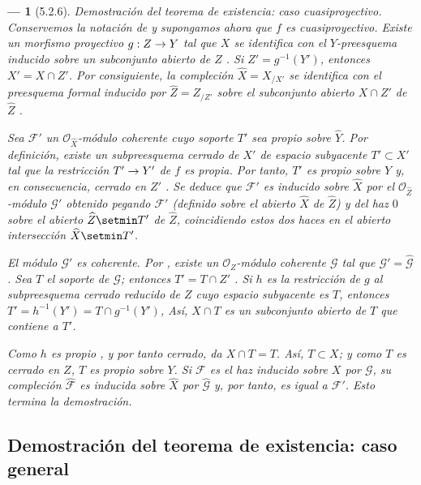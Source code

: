 \documentclass[10pt,oneside,openany]{book}
\theoremstyle{egaenv}\newtheorem*{env}{---}
\theoremstyle{egastatement}
\theoremstyle{egadescription}
\newcommand{\oldpage}[2][]{\marginnote{\normalfont\scriptsize\textbf{#1}\,|\,#2}\ignorespaces}
\renewcommand{\to}{\mathchoice{\longrightarrow}{\rightarrow}{\rightarrow}{\rightarrow}}
\begin{document}
\begin{env}[5.2.6]
\label{III.5.2.6}
\label{III.5.2.6-fr}
\emph{Demostración del teorema de existencia: caso cuasiproyectivo.}
Conservemos la notación de  y supongamos ahora que $f$
es \emph{cuasiproyectivo}. Existe un morfismo proyectivo
$g:Z\to Y$ tal que $X$ se identifica con el $Y$-preesquema
inducido sobre un subconjunto abierto de $Z$ . Si
$Z'=g^{-1}(Y')$, entonces $X'=X\cap Z'$. Por consiguiente, la compleción
$\widehat X=X_{/X'}$ se identifica con el preesquema formal
inducido por $\widehat Z=Z_{/Z'}$ sobre el subconjunto abierto $X\cap Z'$ de
$\widehat Z$ .

Sea $\mathcal F'$ un $\mathcal O_{\widehat X}$-módulo coherente cuyo
soporte $T'$ sea \emph{propio sobre} $\widehat Y$. Por definición, existe
un subpreesquema cerrado de $X'$ de espacio subyacente
$T'\subset X'$ tal que la restricción $T'\to Y'$ de $f$ es
propia. Por tanto, $T'$ es propio \emph{sobre} $Y$ y, en consecuencia, \emph{cerrado en}
$Z'$ . Se deduce que $\mathcal F'$ es inducido
sobre $\widehat X$ por el $\mathcal O_{\widehat Z}$-módulo $\mathcal G'$
obtenido pegando $\mathcal F'$ (definido sobre el abierto $\widehat X$ de $\widehat Z$) y
del haz $0$ sobre el abierto $\widehat Z\setmin T'$ de $\widehat Z$, coincidiendo estos dos haces
en el abierto intersección $\widehat X\setmin T'$.

El módulo $\mathcal G'$ es coherente. Por , existe un
$\mathcal O_Z$-módulo coherente $\mathcal G$ tal que
$\mathcal G'=\widehat{\mathcal G}$. Sea $T$ el soporte de $\mathcal G$;
entonces $T'=T\cap Z'$ . Si $h$ es la restricción
de $g$ al subpreesquema cerrado reducido de $Z$ cuyo espacio subyacente
es $T$, entonces
$T'=h^{-1}(Y')=T\cap g^{-1}(Y')$,
Así, $X\cap T$ es un subconjunto abierto de $T$ que contiene a $T'$.

\oldpage[III]{154}
Como $h$ es propio , y por tanto cerrado,
 da $X\cap T=T$. Así, $T\subset X$; y
como $T$ es cerrado en $Z$, $T$ es propio sobre $Y$. Si $\mathcal F$ es
el haz inducido sobre $X$ por $\mathcal G$, su compleción
$\widehat{\mathcal F}$ es inducida sobre $\widehat X$ por
$\widehat{\mathcal G}$  y, por tanto, es igual a
$\mathcal F'$. Esto termina la demostración.
\end{env}


\subsection{Demostración del teorema de existencia: caso general}
\label{subsection:III.5.3}
\label{subsection:III.5.3-fr}
\end{document}
